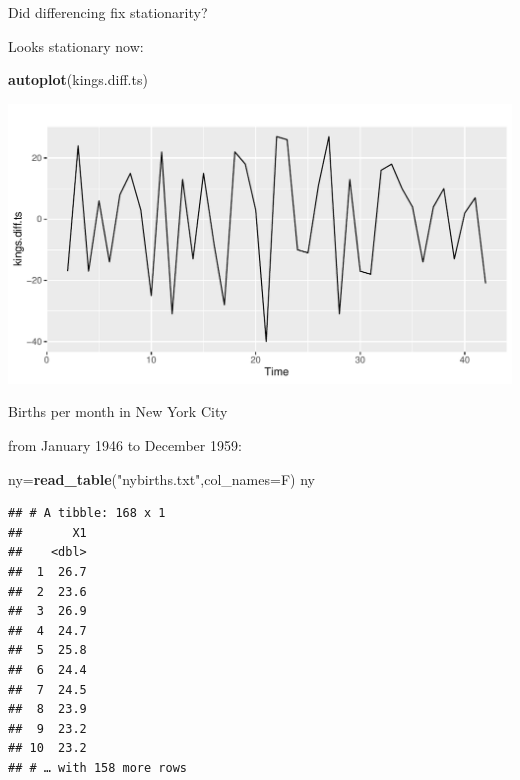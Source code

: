 \documentclass[ignorenonframetext,]{beamer}
\newenvironment{Shaded}{\begin{snugshade}}{\end{snugshade}}
\newcommand{\DataTypeTok}[1]{\textcolor[rgb]{0.13,0.29,0.53}{#1}}
\newcommand{\KeywordTok}[1]{\textcolor[rgb]{0.13,0.29,0.53}{\textbf{#1}}}
\newcommand{\NormalTok}[1]{#1}
\newcommand{\StringTok}[1]{\textcolor[rgb]{0.31,0.60,0.02}{#1}}
\begin{document}
\begin{frame}[fragile]{Did differencing fix stationarity?}
\protect\hypertarget{did-differencing-fix-stationarity}{}

Looks stationary now:

\begin{Shaded}
\begin{Highlighting}[]
\KeywordTok{autoplot}\NormalTok{(kings.diff.ts)}
\end{Highlighting}
\end{Shaded}

\includegraphics{figure/Differenced-Kings-Series-1.pdf}

\end{frame}

\begin{frame}[fragile]{Births per month in New York City}
\protect\hypertarget{births-per-month-in-new-york-city}{}

from January 1946 to December 1959:

\small

\begin{Shaded}
\begin{Highlighting}[]
\NormalTok{ny=}\KeywordTok{read_table}\NormalTok{(}\StringTok{"nybirths.txt"}\NormalTok{,}\DataTypeTok{col_names=}\NormalTok{F)}
\NormalTok{ny}
\end{Highlighting}
\end{Shaded}

\begin{verbatim}
## # A tibble: 168 x 1
##       X1
##    <dbl>
##  1  26.7
##  2  23.6
##  3  26.9
##  4  24.7
##  5  25.8
##  6  24.4
##  7  24.5
##  8  23.9
##  9  23.2
## 10  23.2
## # … with 158 more rows
\end{verbatim}

\normalsize

\end{frame}
\end{document}
